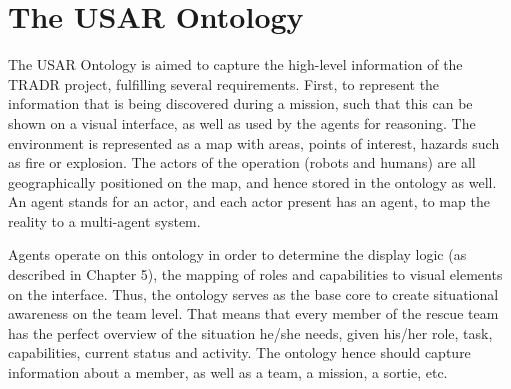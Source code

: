 \chapter{The USAR Ontology}
The USAR Ontology is aimed to capture the high-level information of the TRADR project, fulfilling several requirements. First, to represent the information that is being discovered during a mission, such that this can be shown on a visual interface, as well as used by the agents for reasoning. 
The environment is represented as a map with areas, points of interest, hazards such as fire or explosion. The actors of the operation (robots and humans) are all geographically positioned on the map, and hence stored in the ontology as well. An agent stands for an actor, and each actor present has an agent, to map the reality to a multi-agent system. 

Agents operate on this ontology in order to determine the display logic (as described in Chapter 5), the mapping of roles and capabilities to visual elements on the interface. Thus, the ontology serves as the base core to create situational awareness on the team level. That means that every member of the rescue team has the perfect overview of the situation he/she needs, given his/her role, task, capabilities, current status and activity. The ontology hence should capture information about a member, as well as a team, a mission, a sortie, etc. 

